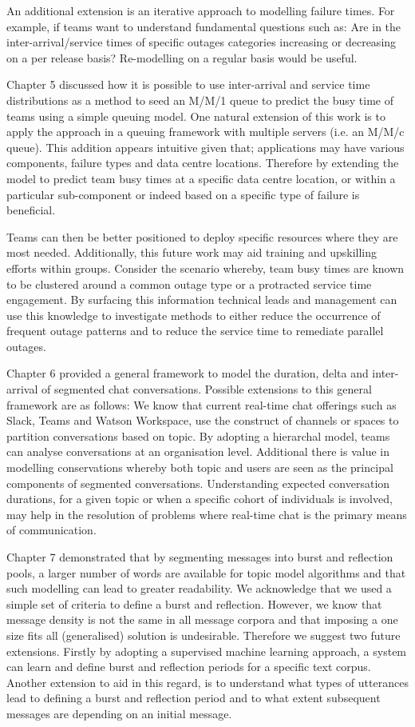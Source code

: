An additional extension is an iterative approach to modelling failure times. For example, if teams want to understand fundamental questions such as: Are in the inter-arrival/service times of specific outages categories increasing or decreasing on a per release basis? Re-modelling on a regular basis would be useful.

Chapter 5 discussed how it is possible to use inter-arrival and service time distributions as a method to seed an M/M/1 queue to predict the busy time of teams using a simple queuing model. One natural extension of this work is to apply the approach in a queuing framework with multiple servers (i.e. an M/M/c queue). This addition appears intuitive given that; applications may have various components, failure types and data centre locations. Therefore by extending the model to predict team busy times at a specific data centre location, or within a particular sub-component or indeed based on a specific type of failure is beneficial. 

Teams can then be better positioned to deploy specific resources where they are most needed. Additionally, this future work may aid training and upskilling efforts within groups. Consider the scenario whereby, team busy times are known to be clustered around a common outage type or a protracted service time engagement. By surfacing this information technical leads and management can use this knowledge to investigate methods to either reduce the occurrence of frequent outage patterns and to reduce the service time to remediate parallel outages.

Chapter 6 provided a general framework to model the duration, delta and inter-arrival of segmented chat conversations. Possible extensions to this general framework are as follows: We know that current real-time chat offerings such as Slack, Teams and Watson Workspace, use the construct of channels or spaces to partition conversations based on topic. By adopting a hierarchal model, teams can analyse conversations at an organisation level. Additional there is value in modelling conservations whereby both topic and users are seen as the principal components of segmented conversations. Understanding expected conversation durations, for a given topic or when a specific cohort of individuals is involved, may help in the resolution of problems where real-time chat is the primary means of communication.

Chapter 7 demonstrated that by segmenting messages into burst and reflection pools, a larger number of words are available for topic model algorithms and that such modelling can lead to greater readability. We acknowledge that we used a simple set of criteria to define a burst and reflection. However, we know that message density is not the same in all message corpora and that imposing a one size fits all (generalised) solution is undesirable. Therefore we suggest two future extensions. Firstly by adopting a supervised machine learning approach, a system can learn and define burst and reflection periods for a specific text corpus. Another extension to aid in this regard, is to understand what types of utterances lead to defining a burst and reflection period and to what extent subsequent messages are depending on an initial message.
 
